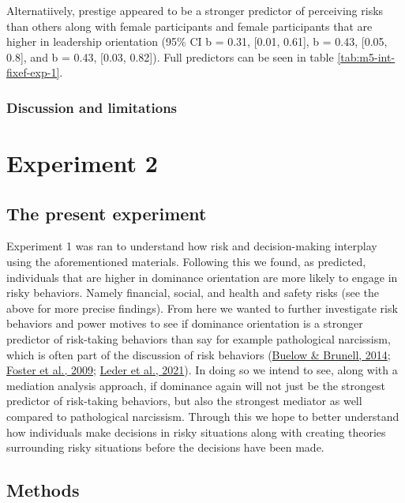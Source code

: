 \documentclass[
  donotrepeattitle,doc, 12pt, a4paper,floatsintext]{apa7}
\begin{document}
Alternatiively, prestige appeared to be a stronger predictor of perceiving risks than others along with female participants and female participants that are higher in leadership orientation (95\% CI b = 0.31, {[}0.01, 0.61{]}, b = 0.43, {[}0.05, 0.8{]}, and b = 0.43, {[}0.03, 0.82{]}). Full predictors can be seen in table \ref{tab:m5-int-fixef-exp-1}.

\hypertarget{discussion-and-limitations}{%
\subsubsection{Discussion and limitations}\label{discussion-and-limitations}}

\newpage

\hypertarget{experiment-2}{%
\section{Experiment 2}\label{experiment-2}}

\hypertarget{the-present-experiment}{%
\subsection{The present experiment}\label{the-present-experiment}}

Experiment 1 was ran to understand how risk and decision-making interplay using the aforementioned materials. Following this we found, as predicted, individuals that are higher in dominance orientation are more likely to engage in risky behaviors. Namely financial, social, and health and safety risks (see the above for more precise findings). From here we wanted to further investigate risk behaviors and power motives to see if dominance orientation is a stronger predictor of risk-taking behaviors than say for example pathological narcissism, which is often part of the discussion of risk behaviors (\protect\hyperlink{ref-buelow2014}{Buelow \& Brunell, 2014}; \protect\hyperlink{ref-foster2009}{Foster et al., 2009}; \protect\hyperlink{ref-leder2021}{Leder et al., 2021}). In doing so we intend to see, along with a mediation analysis approach, if dominance again will not just be the strongest predictor of risk-taking behaviors, but also the strongest mediator as well compared to pathological narcissism. Through this we hope to better understand how individuals make decisions in risky situations along with creating theories surrounding risky situations before the decisions have been made.

\hypertarget{methods-1}{%
\subsection{Methods}\label{methods-1}}
\end{document}
